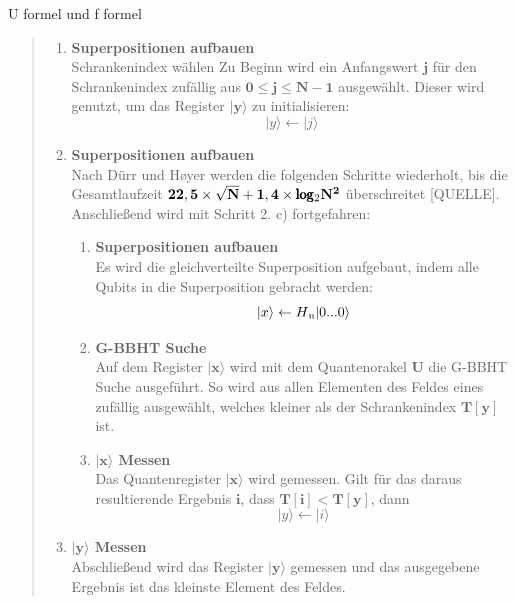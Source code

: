 U formel und f formel
\begin{quote}
    \begin{enumerate}
        \item \textbf{Superpositionen aufbauen}
        \\
        Schrankenindex wählen
        Zu Beginn wird ein Anfangswert $\mathbf{j}$ für den Schrankenindex zufällig aus $\mathbf{0 \leq j \leq N-1}$ ausgewählt. Dieser wird genutzt, um das Register $\mathbf{|y\rangle}$ zu initialisieren: 
        \begin{equation}
            |y\rangle \leftarrow |j\rangle
        \end{equation}
        \item \textbf{Superpositionen aufbauen}
        \\
        Nach Dürr und Høyer werden die folgenden Schritte wiederholt, bis die Gesamtlaufzeit $\mathbf{22,5 \times \sqrt{N} + 1,4 \times \pmb\log\textsubscript{2}N^2}$ überschreitet [QUELLE]. 
        Anschließend wird mit Schritt 2. c) fortgefahren:
        \\
        \begin{enumerate}
            \item \textbf{Superpositionen aufbauen}
            \\
            Es wird die gleichverteilte Superposition aufgebaut, indem alle Qubits in die Superposition gebracht werden:
            \begin{equation}
                |x\rangle \leftarrow H\textsubscript{n}|0 ... 0 \rangle
            \end{equation}
            \item \textbf{G-BBHT Suche}
            \\
            Auf dem Register $\mathbf{|x\rangle}$ wird mit dem Quantenorakel $\mathbf{U}$ die G-BBHT Suche ausgeführt. 
            So wird aus allen Elementen des Feldes eines zufällig ausgewählt, welches kleiner als der Schrankenindex $\mathbf{T[y]}$ ist.
            \item \textbf{$\mathbf{|x\rangle}$ Messen}
            \\
            Das Quantenregister $\mathbf{|x\rangle}$ wird gemessen. 
            Gilt für das daraus resultierende Ergebnis $\mathbf{i}$, dass $\mathbf{T[i] < T[y]}$, dann 
            \begin{equation}
                |y\rangle \leftarrow |i\rangle
            \end{equation}
        \end{enumerate}

        \item \textbf{$\mathbf{|y\rangle}$ Messen}
        \\
        Abschließend wird das Register $\mathbf{|y\rangle}$ gemessen und das ausgegebene Ergebnis ist das kleinste Element des Feldes.
    \end{enumerate}
\end{quote}


